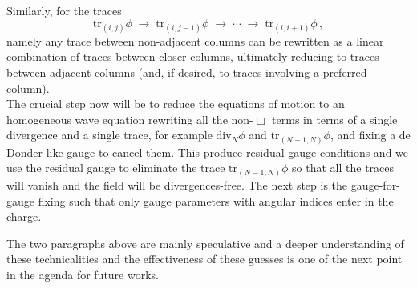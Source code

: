 \documentclass[a4paper,12pt]{article}
\begin{document}
Similarly, for the traces
\begin{equation}
    \mathrm{tr}_{(i,j)} \phi \;\longrightarrow\; 
\mathrm{tr}_{(i,j-1)} \phi \;\longrightarrow\; \cdots \;\longrightarrow\;
\mathrm{tr}_{(i,i+1)} \phi \, ,
\end{equation}
namely any trace between non-adjacent columns can be rewritten as a linear combination of traces between closer columns, ultimately reducing to traces between adjacent columns (and, if desired, to traces involving a preferred column). \\
The crucial step now will be to reduce the equations of motion to an homogeneous wave equation rewriting all the non-$\Box$ terms in terms of a single divergence and a single trace, for example $\mathrm{div}_N\phi$ and $\mathrm{tr}_{(N-1,N)}\phi$, and fixing a de Donder-like gauge to cancel them. This produce residual gauge conditions and we use the residual gauge to eliminate the trace $\mathrm{tr}_{(N-1,N)}\phi$ so that all the traces will vanish and the field will be divergences-free. The next step is the gauge-for-gauge fixing such that only gauge parameters with angular indices enter in the charge. 

The two paragraphs above are mainly speculative and a deeper understanding of these technicalities and the effectiveness of these guesses is one of the next point in the agenda for future works.
\end{document}
